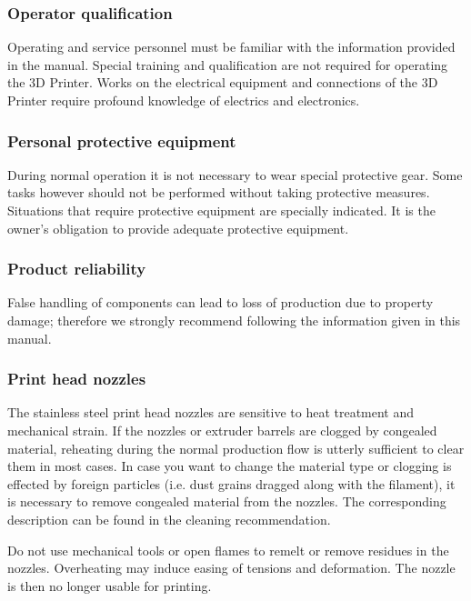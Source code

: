 \subsubsection{Operator qualification}

Operating and service personnel must be familiar with the information provided in the manual. Special training and qualification are not required for operating the 3D Printer. Works on the electrical equipment and connections of the 3D Printer require profound knowledge of electrics and electronics.


\subsubsection{Personal protective equipment}

During normal operation it is not necessary to wear special protective gear. Some tasks however should not be performed without taking protective measures. Situations that require protective equipment are specially indicated. It is the owner's obligation to provide adequate protective equipment.


\subsubsection{Product reliability}

False handling of components can lead to loss of production due to property damage; therefore we strongly recommend following the information given in this manual.


\subsubsection{Print head nozzles}

The stainless steel print head nozzles are sensitive to heat treatment and mechanical strain.
If the nozzles or extruder barrels are clogged by congealed material, reheating during the normal production flow is utterly sufficient to clear them in most cases.
In case you want to change the material type or clogging is effected by foreign particles (i.e. dust grains dragged along with the filament), it is necessary to remove congealed material from the nozzles. The corresponding description can be found in the cleaning recommendation.

\begin{notice}
  Do not use mechanical tools or open flames to remelt or remove residues in the nozzles. Overheating may induce easing of tensions and deformation. The nozzle is then no longer usable for printing.
\end{notice}
